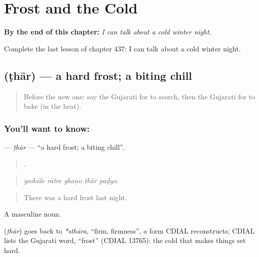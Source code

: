 
\chapter{Frost and the Cold}
\label{ch:gu-frost-and-the-cold}

\begin{chapteropening}
\textbf{By the end of this chapter:} \emph{I can talk about a cold winter night.}

Complete the last lesson of chapter 437: I can talk about a cold winter night.
\end{chapteropening}

\section[\texorpdfstring{\gu{ઠાર} (ṭhār)}{ઠાર (ṭhār)}]{ (ṭhār) — a hard frost; a biting chill}

\label{lesson:GU-C437-thar}



\begin{quote}
Before the new one: say the Gujarati for to scorch, then the Gujarati for to bake (in the heat).
\end{quote}

\subsection*{You'll want to know: }
\textbf{} — \emph{ṭhār} — \textquotedblleft{}a hard frost; a biting chill\textquotedblright{}.

\begin{quote}
    .
\end{quote}

\begin{quote}
\emph{gaīkāle rātre ghaṇo ṭhār paḍyo.}
\end{quote}

\begin{quote}
There was a hard frost last night.
\end{quote}

A masculine noun.

\begin{cousinweb}
\textbf{} (\emph{ṭhār}) goes back to \emph{*sthāra}, \textquotedblleft{}firm, firmness\textquotedblright{}, a form CDIAL reconstructs; CDIAL lists the Gujarati word, \textquotedblleft{}frost\textquotedblright{} (CDIAL 13765): the cold that makes things set hard.
\end{cousinweb}

